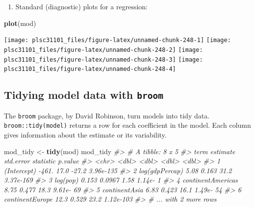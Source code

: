 \documentclass[
]{book}
\newenvironment{Shaded}{\begin{snugshade}}{\end{snugshade}}
\newcommand{\CommentTok}[1]{\textcolor[rgb]{0.56,0.35,0.01}{\textit{#1}}}
\newcommand{\KeywordTok}[1]{\textcolor[rgb]{0.13,0.29,0.53}{\textbf{#1}}}
\newcommand{\NormalTok}[1]{#1}
\newcommand{\StringTok}[1]{\textcolor[rgb]{0.31,0.60,0.02}{#1}}
\providecommand{\tightlist}{%
  \setlength{\itemsep}{0pt}\setlength{\parskip}{0pt}}
\begin{document}
\begin{enumerate}
\def\labelenumi{\arabic{enumi}.}
\setcounter{enumi}{3}
\tightlist
\item
  Standard (diagnostic) plots for a regression:
\end{enumerate}

\begin{Shaded}
\begin{Highlighting}[]
\KeywordTok{plot}\NormalTok{(mod)}
\end{Highlighting}
\end{Shaded}

\begin{center}\texttt{[image: plsc31101\_files/figure-latex/unnamed-chunk-248-1]} \texttt{[image: plsc31101\_files/figure-latex/unnamed-chunk-248-2]} \texttt{[image: plsc31101\_files/figure-latex/unnamed-chunk-248-3]} \texttt{[image: plsc31101\_files/figure-latex/unnamed-chunk-248-4]} \end{center}

\hypertarget{tidying-model-data-with-broom}{%
\subsection{\texorpdfstring{Tidying model data with \texttt{broom}}{Tidying model data with broom}}\label{tidying-model-data-with-broom}}

The \texttt{broom} package, by David Robinson, turn models into tidy data.
\texttt{broom::tidy(model)} returns a row for each coefficient in the model. Each column gives information about the estimate or its variability.

\begin{Shaded}
\begin{Highlighting}[]
\NormalTok{mod_tidy <-}\StringTok{ }\KeywordTok{tidy}\NormalTok{(mod)}
\NormalTok{mod_tidy}
\CommentTok{#> # A tibble: 8 x 5}
\CommentTok{#>   term              estimate std.error statistic   p.value}
\CommentTok{#>   <chr>                <dbl>     <dbl>     <dbl>     <dbl>}
\CommentTok{#> 1 (Intercept)       -461.      17.0       -27.2  3.96e-135}
\CommentTok{#> 2 log(gdpPercap)       5.08     0.163      31.2  3.37e-169}
\CommentTok{#> 3 log(pop)             0.153    0.0967      1.58 1.14e-  1}
\CommentTok{#> 4 continentAmericas    8.75     0.477      18.3  9.61e- 69}
\CommentTok{#> 5 continentAsia        6.83     0.423      16.1  1.49e- 54}
\CommentTok{#> 6 continentEurope     12.3      0.529      23.2  1.12e-103}
\CommentTok{#> # ... with 2 more rows}
\end{Highlighting}
\end{Shaded}
\end{document}
